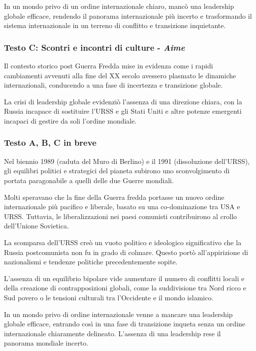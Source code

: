 \documentclass{article}
\begin{document}
In un mondo privo di un ordine internazionale chiaro, mancò una leadership globale efficace,
rendendo il panorama internazionale più incerto e trasformando il sistema internazionale in un
terreno di conflitto e transizione inquietante.

\subsubsection{Testo C: Scontri e incontri di culture - \textit{Aime}}
Il contesto storico post Guerra Fredda mise in evidenza come i rapidi cambiamenti avvenuti alla
fine del XX secolo avessero plasmato le dinamiche internazionali, conducendo a una fase di
incertezza e transizione globale.

La crisi di leadership globale evidenziò l'assenza di una direzione chiara, con la Russia
incapace di sostituire l'URSS e gli Stati Uniti e altre potenze emergenti incapaci di gestire da
soli l'ordine mondiale.

\subsubsection{Testo A, B, C in breve}
Nel biennio 1989 (caduta del Muro di Berlino) e il 1991 (dissoluzione dell'URSS), gli
equilibri politici e strategici del pianeta subirono uno sconvolgimento di portata
paragonabile a quelli delle due Guerre mondiali.

Molti speravano che la fine della Guerra fredda portasse un nuovo ordine internazionale più
pacifico e liberale, basato su una co-dominazione tra USA e URSS. Tuttavia, le liberalizzazioni
nei paesi comunisti contribuirono al crollo dell'Unione Sovietica.

La scomparsa dell'URSS creò un vuoto politico e ideologico significativo che la Russia
postcomunista non fu in grado di colmare. Questo portò all'appirizione di nazionalismi e
tendenze politiche precedentemente sopite.

L'assenza di un equilibrio bipolare vide aumentare il numero di conflitti locali e della
creazione di contrapposizioni globali, come la suddivisione tra Nord ricco e Sud povero o
le tensioni culturali tra l'Occidente e il mondo islamico.

In un mondo privo di ordine internazionale venne a mancare una leadership globale efficace,
entrando così in una fase di transizione inqueta senza un ordine internazionale chiaramente
delineato. L'assenza di una leadership rese il panorama mondiale incerto.
\vspace*{.5cm}
\end{document}

